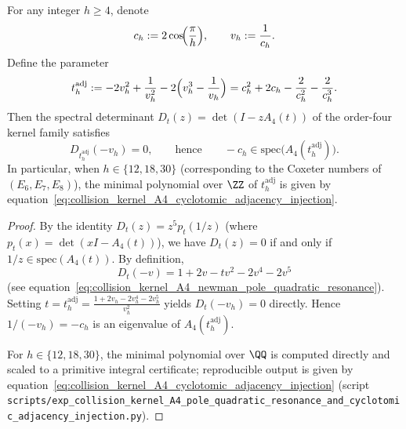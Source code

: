 %
%

\begin{proposition}\label{prop:pom-a4t-cyclotomic-adjacency-injection}
For any integer \(h\ge 4\), denote
\[
c_h:=2\cos\!\Bigl(\frac{\pi}{h}\Bigr),\qquad v_h:=\frac{1}{c_h}.
\]
Define the parameter
\[
t_h^{\mathrm{adj}}
:=-2v_h^2+\frac{1}{v_h^2}-2\Bigl(v_h^3-\frac{1}{v_h}\Bigr)
=c_h^2+2c_h-\frac{2}{c_h^2}-\frac{2}{c_h^3}.
\]
Then the spectral determinant \(D_t(z)=\det(I-zA_4(t))\) of the order-four kernel family satisfies
\[
D_{t_h^{\mathrm{adj}}}(-v_h)=0,
\qquad\text{hence}\qquad
-c_h\in\mathrm{spec}\bigl(A_4(t_h^{\mathrm{adj}})\bigr).
\]
In particular, when \(h\in\{12,18,30\}\) (corresponding to the Coxeter numbers of \((E_6,E_7,E_8)\)), the minimal polynomial over \(\ZZ\) of \(t_h^{\mathrm{adj}}\) is given by equation~\eqref{eq:collision_kernel_A4_cyclotomic_adjacency_injection}.
\end{proposition}
\begin{proof}
By the identity \(D_t(z)=z^5p_t(1/z)\) (where \(p_t(x)=\det(xI-A_4(t))\)), we have \(D_t(z)=0\) if and only if \(1/z\in\mathrm{spec}(A_4(t))\).
By definition,
\[
D_t(-v)=1+2v-tv^2-2v^4-2v^5
\]
(see equation~\eqref{eq:collision_kernel_A4_newman_pole_quadratic_resonance}).
Setting \(t=t_h^{\mathrm{adj}}=\frac{1+2v_h-2v_h^4-2v_h^5}{v_h^2}\) yields \(D_t(-v_h)=0\) directly.
Hence \(1/(-v_h)=-c_h\) is an eigenvalue of \(A_4(t_h^{\mathrm{adj}})\).
\par
For \(h\in\{12,18,30\}\), the minimal polynomial over \(\QQ\) is computed directly and scaled to a primitive integral certificate; reproducible output is given by equation~\eqref{eq:collision_kernel_A4_cyclotomic_adjacency_injection} (script \texttt{scripts/exp\_collision\_kernel\_A4\_pole\_quadratic\_resonance\_and\_cyclotomic\_adjacency\_injection.py}).
\end{proof}



